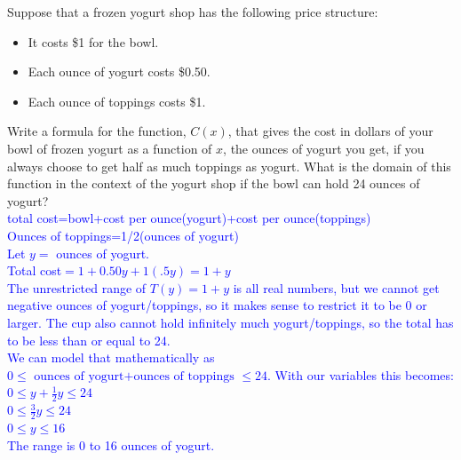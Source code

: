 \documentclass{ximera}
\begin{document}
\begin{exercise}
Suppose that a frozen yogurt shop has the following price structure: 
 \begin{itemize}
     \item It costs \$1 for the bowl.
     \item Each ounce of yogurt costs \$0.50.
     \item Each ounce of toppings costs \$1.
 \end{itemize}
 Write a formula for the function, $C(x)$, that gives the cost in dollars of your bowl of frozen yogurt as a function of $x$, the ounces of yogurt you get, if you always choose to get half as much toppings as yogurt. What is the domain of this function in the context of the yogurt shop if the bowl can hold 24 ounces of yogurt?\\
 \textcolor{blue}{total cost=bowl+cost per ounce(yogurt)+cost per ounce(toppings)\\
 Ounces of toppings=1/2(ounces of yogurt)\\
 Let $y=$ ounces of yogurt.\\
 Total cost$=1+0.50y+1(.5y)=1+y$\\
 The unrestricted range of $T(y)=1+y$ is all real numbers, but we cannot get negative ounces of yogurt/toppings, so it makes sense to restrict it to be 0 or larger.  The cup also cannot hold infinitely much yogurt/toppings, so the total has to be less than or equal to 24.\\
 We can model that mathematically as $0\leq\text{ ounces of yogurt+ounces of toppings }\leq 24$. With our variables this becomes:
 $0\leq y+\frac12 y\leq 24$\\
 $0\leq \frac32 y\leq 24$\\
 $0\leq y\leq 16$\\
 The range is 0 to 16 ounces of yogurt. }
\end{exercise}
\end{document}
